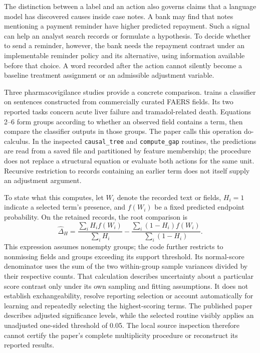 The distinction between a label and an action also governs claims that a
language model has discovered causes inside case notes. A bank may find that
notes mentioning a payment reminder have higher predicted repayment. Such a
signal can help an analyst search records or formulate a hypothesis. To decide
whether to send a reminder, however, the bank needs the repayment contrast
under an implementable reminder policy and its alternative, using information
available before that choice. A word recorded after the action cannot silently
become a baseline treatment assignment or an admissible adjustment variable.

Three pharmacovigilance studies provide a concrete comparison.
\citet{rel66inferbert} trains a classifier on sentences constructed from
commercially curated FAERS fields. Its two reported tasks concern acute liver
failure and tramadol-related death. Equations 2--6 form groups according to
whether an observed field contains a term, then compare the classifier outputs
in those groups. The paper calls this operation do-calculus. In the inspected
\texttt{causal\_tree} and \texttt{compute\_gap} routines, the predictions are
read from a saved file and partitioned by feature membership; the procedure
does not replace a structural equation or evaluate both actions for the same
unit. Recursive restriction to records containing an earlier term does not
itself supply an adjustment argument. \citep{rel66inferbertcode}

To state what this computes, let $W_i$ denote the recorded text or fields,
$H_i=1$ indicate a selected term's presence, and $f(W_i)$ be a fixed predicted
endpoint probability. On the retained records, the root comparison is
\begin{equation}
 \widehat\Delta_H=
 \frac{\sum_i H_i f(W_i)}{\sum_i H_i}
 -\frac{\sum_i(1-H_i)f(W_i)}{\sum_i(1-H_i)}.
 \label{eq:rel66-score-gap}
\end{equation}
This expression assumes nonempty groups; the code further restricts to
nonmissing fields and groups exceeding its support threshold. Its normal-score
denominator uses the sum of the two within-group sample variances divided by
their respective counts. That calculation describes uncertainty about a
particular score contrast only under its own sampling and fitting assumptions.
It does not establish exchangeability, resolve reporting selection or account
automatically for learning and repeatedly selecting the highest-scoring terms.
The published paper describes adjusted significance levels, while the selected
routine visibly applies an unadjusted one-sided threshold of 0.05. The local
source inspection therefore cannot certify the paper's complete multiplicity
procedure or reconstruct its reported results. \citep{rel66inferbert,rel66inferbertcode}

